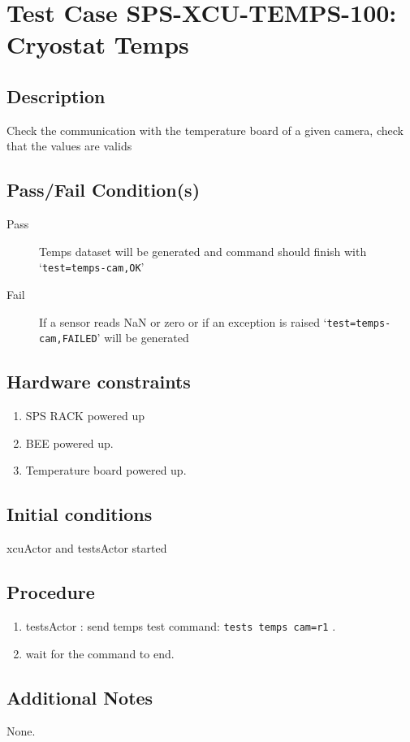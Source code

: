 \section{Test Case SPS-XCU-TEMPS-100: Cryostat Temps}

\subsection{Description}

Check the communication with the temperature board of a given camera, check that the values are valids

\subsection{Pass/Fail Condition(s)}

\begin{description}
\item [Pass] Temps dataset will be generated and command should finish with `\texttt{test=temps-cam,OK}'
\item [Fail] If a sensor reads NaN or zero or if an exception is raised `\texttt{test=temps-cam,FAILED}' will be generated

\end{description}

\subsection{Hardware constraints}

\begin{enumerate}
    \item SPS RACK powered up
    \item BEE powered up.
    \item Temperature board powered up.
\end{enumerate}

\subsection{Initial conditions}

xcuActor and testsActor started

\subsection{Procedure}

\begin{enumerate}
    \item testsActor : send temps test command: \texttt{tests temps cam=r1} .
    \item wait for the command to end.
\end{enumerate}

\subsection{Additional Notes}
None.
